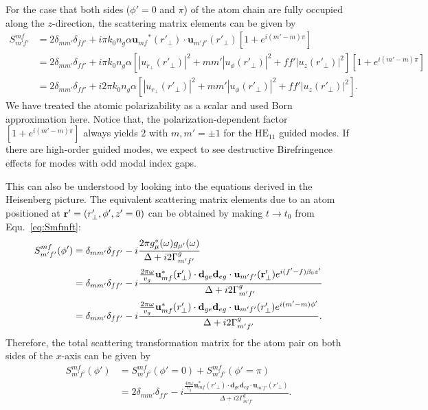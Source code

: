 \documentclass[preprint,aps,pra,onecolumn]{revtex4-1} %
\begin{document}
For the case that both sides ($ \phi'=0 $ and $\pi  $) of the atom chain are fully occupied along the $z$-direction, the scattering matrix elements can be given by
\begin{align}
\!\!\!\!\!\!S^{mf}_{m'f'} &= 2\delta_{mm'}\delta_{ff'} + i\pi k_0 n_g\alpha  {\mathbf{u}_{mf}}^*(r'_{\!\perp})\cdot \mathbf{u}_{m'f'}(r'_{\!\perp})[1+e^{i(m'-m)\pi}]\\
&= 2\delta_{mm'}\delta_{ff'} + i\pi k_0 n_g\alpha  \left[ |u_{r\!_\perp}(r'_{\!\perp})|^2+mm' |u_\phi(r'_{\!\perp})|^2+ff'|u_z(r'_\perp)|^2\right][1+e^{i(m'-m)\pi}]\\
&= 2\delta_{mm'}\delta_{ff'} + i2\pi k_0 n_g\alpha  \left[ |u_{r\!_\perp}(r'_{\!\perp})|^2+mm' |u_\phi(r'_{\!\perp})|^2+ff'|u_z(r'_\perp)|^2\right].
\end{align}
We have treated the atomic polarizability as a scalar and used Born approximation here. Notice that, the polarization-dependent factor $[1+e^{i(m'-m)\pi}]$ always yields $2$ with $m,m'=\pm 1$ for the $\mathrm{HE}_{11}$ guided modes. If there are high-order guided modes, we expect to see destructive Birefringence effects for modes with odd modal index gaps. 

This can also be understood by looking into the equations derived in the Heisenberg picture. The equivalent scattering matrix elements due to an atom positioned at $\mathbf{r}'=(r'_\perp,\phi',z'=0)$ can be obtained by making $t\rightarrow t_0$ from Equ.~\eqref{eq:Smfmft}:
\begin{align}\label{eq:Smfmfphi_Heisenberg}
S^{mf}_{m'f'}(\phi') &=\delta_{mm'}\delta_{ff'}-i\frac{2\pi g_\mu^*(\omega)g_{\mu'}(\omega)}{\Delta+i2\Gamma^g_{m'f'}}\\
&= \delta_{mm'}\delta_{ff'}-i\frac{ \frac{2\pi \omega}{v_g}\mathbf{u}^*_{mf}(\mathbf{r}'_\perp)\cdot\mathbf{d}_{ge} \mathbf{d}_{eg}\cdot\mathbf{u}_{m'f'}(\mathbf{r}'_\perp)e^{i(f'-f)\beta_0 z'}}{\Delta+i2\Gamma^g_{m'f'}}\\
&=  \delta_{mm'}\delta_{ff'}-i\frac{ \frac{2\pi \omega}{v_g}\mathbf{u}^*_{mf}(r'_\perp)\cdot\mathbf{d}_{ge} \mathbf{d}_{eg}\cdot\mathbf{u}_{m'f'}(r'_\perp)e^{i(m'-m)\phi'}}{\Delta+i2\Gamma^g_{m'f'}}.
\end{align}
Therefore, the total scattering transformation matrix for the atom pair on both sides of the $x$-axis can be given by
\begin{align}\label{eq:Smfmf2_Heisenberg}
S^{mf}_{m'f'}(\phi') &=S^{mf}_{m'f'}(\phi'=0)+S^{mf}_{m'f'}(\phi'=\pi)\\
&=  2\delta_{mm'}\delta_{ff'}-i\frac{ \frac{4\pi \omega}{v_g}\mathbf{u}^*_{mf}(r'_\perp)\cdot\mathbf{d}_{ge} \mathbf{d}_{eg}\cdot\mathbf{u}_{m'f'}(r'_\perp)}{\Delta+i2\Gamma^g_{m'f'}}.
\end{align}
\end{document}
